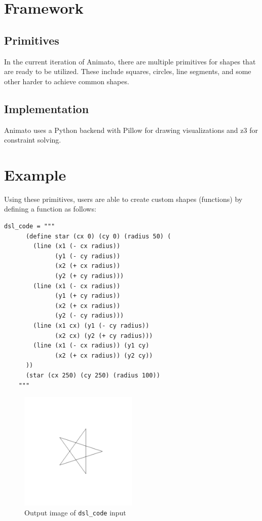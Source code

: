 \documentclass[acmsmall,screen]{acmart}
\begin{document}
\section{Framework}
\subsection{Primitives}
In the current iteration of Animato, there are multiple primitives for shapes that are ready to be utilized.
These include squares, circles, line segments, and some other harder to achieve common shapes. 

\subsection{Implementation}
Animato uses a Python backend with Pillow for drawing visualizations and z3 for constraint solving.

\section{Example}
Using these primitives, users are able to create custom shapes (functions) by defining a function as follows:

\begin{lstlisting}[label=code, caption=Sample custom function definition in Animato]
    dsl_code = """
      (define star (cx 0) (cy 0) (radius 50) (
        (line (x1 (- cx radius))
              (y1 (- cy radius))
              (x2 (+ cx radius))
              (y2 (+ cy radius)))
        (line (x1 (- cx radius))
              (y1 (+ cy radius))
              (x2 (+ cx radius))
              (y2 (- cy radius)))
        (line (x1 cx) (y1 (- cy radius))
              (x2 cx) (y2 (+ cy radius)))
        (line (x1 (- cx radius)) (y1 cy)
              (x2 (+ cx radius)) (y2 cy))
      ))
      (star (cx 250) (cy 250) (radius 100))
    """
\end{lstlisting}

\begin{center}
  \begin{figure}[!h]
    \includegraphics[width=0.5\textwidth]{images/star.png}
    \caption{Output image of \texttt{dsl\_code} input}
  \end{figure}
\end{center}
\end{document}
